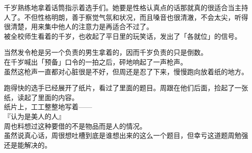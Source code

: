 千岁熟练地拿着话筒指示着选手们。她要是性格认真点的话那就真的很适合当主持人了。不但性格明朗，善于察觉气氛和状况，而且嗓音也很清澈，不会太尖，听得很清楚，用来集中他人的注意力是再适合不过了。\\

被全校师生看着的千岁，也收起了平日里的玩笑话，发出了「各就位」的信号。

当然发令枪是另一个负责的男生拿着的，因而千岁负责的只是倒数。\\

在千岁喊出「预备」口令的一拍之后，砰地响起了一声枪声。\\

虽然这枪声一直都对心脏很是不好，但周还是忍了下来，慢慢跑向放着纸的地方。

跑得快的选手已经展开了纸片，看过了里面的题目。周跟在他们后面，捡起了一张纸，读起了里面的内容。\\

纸片上，工工整整地写着——\\

『认为是美人的人』\\

周也料想过这种要借的不是物品而是人的情况。\\

虽然说真心话，周很想吐槽到底是谁想出来的这么一个题目，但幸亏这道题周勉强还是能解决的。

